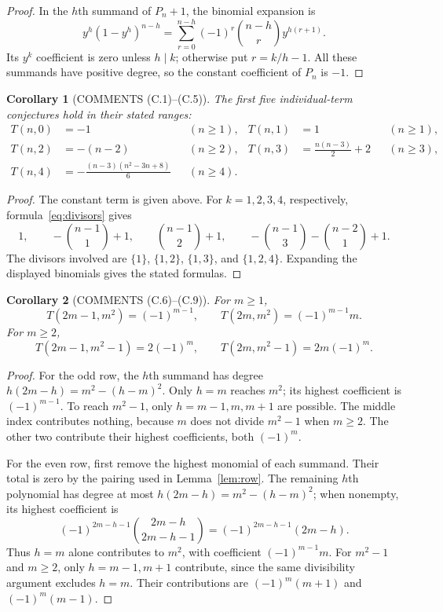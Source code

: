 \documentclass[11pt]{article}
\newtheorem{corollary}{Corollary}
\begin{document}
\begin{proof}
In the $h$th summand of $P_n+1$, the binomial expansion is
\[
 y^h(1-y^h)^{n-h}
 =\sum_{r=0}^{n-h}(-1)^r\binom{n-h}{r}y^{h(r+1)}.
\]
Its $y^k$ coefficient is zero unless $h\mid k$; otherwise put
$r=k/h-1$. All these summands have positive degree, so the constant
coefficient of $P_n$ is $-1$.
\end{proof}

\begin{corollary}[COMMENTS (C.1)--(C.5)]\label{cor:small}
The first five individual-term conjectures hold in their stated ranges:
\begin{align*}
 T(n,0)&=-1 &&(n\geq1),&
 T(n,1)&=1 &&(n\geq1),\\
 T(n,2)&=-(n-2) &&(n\geq2),&
 T(n,3)&=\frac{n(n-3)}2+2 &&(n\geq3),\\
 T(n,4)&=-\frac{(n-3)(n^2-3n+8)}6 &&(n\geq4).
\end{align*}
\end{corollary}

\begin{proof}
The constant term is given above. For $k=1,2,3,4$, respectively,
formula~\eqref{eq:divisors} gives
\[
 1,\qquad -\binom{n-1}{1}+1,\qquad
 \binom{n-1}{2}+1,\qquad
 -\binom{n-1}{3}-\binom{n-2}{1}+1.
\]
The divisors involved are $\{1\}$, $\{1,2\}$, $\{1,3\}$, and
$\{1,2,4\}$. Expanding the displayed binomials gives the stated formulas.
\end{proof}

\begin{corollary}[COMMENTS (C.6)--(C.9)]\label{cor:edges}
For $m\geq1$,
\[
 T(2m-1,m^2)=(-1)^{m-1},\qquad
 T(2m,m^2)=(-1)^{m-1}m.
\]
For $m\geq2$,
\[
 T(2m-1,m^2-1)=2(-1)^m,\qquad
 T(2m,m^2-1)=2m(-1)^m.
\]
\end{corollary}

\begin{proof}
For the odd row, the $h$th summand has degree
$h(2m-h)=m^2-(h-m)^2$. Only $h=m$ reaches $m^2$;
its highest coefficient is $(-1)^{m-1}$. To reach $m^2-1$, only
$h=m-1,m,m+1$ are possible. The middle index contributes nothing,
because $m$ does not divide $m^2-1$ when $m\geq2$.
The other two contribute their highest coefficients, both $(-1)^m$.

For the even row, first remove the highest monomial of each summand.
Their total is zero by the pairing used in Lemma~\ref{lem:row}.
The remaining $h$th polynomial has degree at most
$h(2m-h)=m^2-(h-m)^2$; when nonempty, its highest coefficient is
\[
 (-1)^{2m-h-1}\binom{2m-h}{2m-h-1}
 =(-1)^{2m-h-1}(2m-h).
\]
Thus $h=m$ alone contributes to $m^2$, with coefficient
$(-1)^{m-1}m$. For $m^2-1$ and $m\geq2$, only $h=m-1,m+1$
contribute, since the same divisibility argument excludes $h=m$.
Their contributions are $(-1)^m(m+1)$ and $(-1)^m(m-1)$.
\end{proof}
\end{document}
